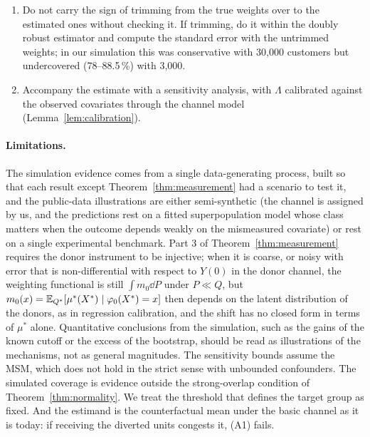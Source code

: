 \begin{enumerate}
  \item Do not carry the sign of trimming from the true weights over to the estimated ones without checking it. If trimming, do it within the doubly robust estimator and compute the standard error with the untrimmed weights; in our simulation this was conservative with 30{,}000 customers but undercovered (78--88.5\,\%) with 3{,}000.
  \item Accompany the estimate with a sensitivity analysis, with $\Lambda$ calibrated against the observed covariates through the channel model (Lemma~\ref{lem:calibration}).
\end{enumerate}

\paragraph{Limitations.} The simulation evidence comes from a single data-generating process, built so that each result except Theorem~\ref{thm:measurement} had a scenario to test it, and the public-data illustrations are either semi-synthetic (the channel is assigned by us, and the predictions rest on a fitted superpopulation model whose class matters when the outcome depends weakly on the mismeasured covariate) or rest on a single experimental benchmark. Part 3 of Theorem~\ref{thm:measurement} requires the donor instrument to be injective; when it is coarse, or noisy with error that is non-differential with respect to $Y(0)$ in the donor channel, the weighting functional is still $\int m_0\dd P$ under $P\ll Q$, but $m_0(x)=\mathbb{E}_{Q^*}[\mu^*(X^*)\mid\varphi_0(X^*)=x]$ then depends on the latent distribution of the donors, as in regression calibration, and the shift has no closed form in terms of $\mu^*$ alone. Quantitative conclusions from the simulation, such as the gains of the known cutoff or the excess of the bootstrap, should be read as illustrations of the mechanisms, not as general magnitudes. The sensitivity bounds assume the MSM, which does not hold in the strict sense with unbounded confounders. The simulated coverage is evidence outside the strong-overlap condition of Theorem~\ref{thm:normality}. We treat the threshold that defines the target group as fixed. And the estimand is the counterfactual mean under the basic channel as it is today: if receiving the diverted units congests it, (A1) fails.

